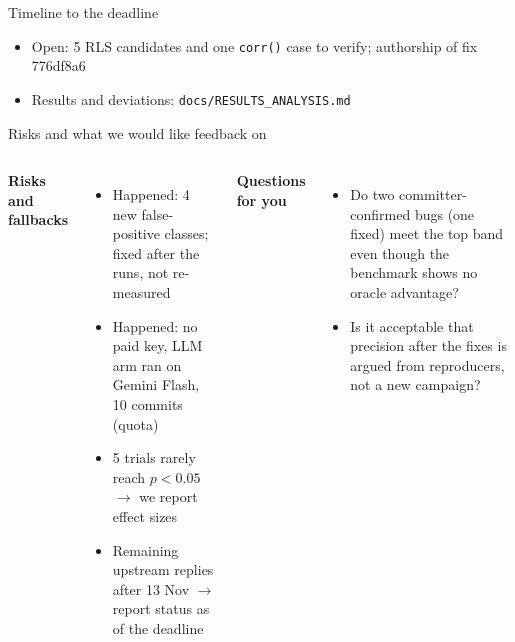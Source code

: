 \documentclass[aspectratio=169,11pt]{beamer}
\begin{document}
\begin{frame}{Timeline to the deadline}
\begin{center}
\end{center}
\small
\begin{itemize}
  \item Open: 5 RLS candidates and one \texttt{corr()} case to verify; authorship of fix 776df8a6
  \item Results and deviations: \texttt{docs/RESULTS\_ANALYSIS.md}
\end{itemize}
\end{frame}

\begin{frame}{Risks and what we would like feedback on}
\begin{columns}[T]
\textbf{Risks and fallbacks}
\small
\begin{itemize}
  \item Happened: 4 new false-positive classes; fixed after the runs, not re-measured
  \item Happened: no paid key, LLM arm ran on Gemini Flash, 10 commits (quota)
  \item 5 trials rarely reach $p<0.05$ $\rightarrow$ we report effect sizes
  \item Remaining upstream replies after 13 Nov $\rightarrow$ report status as of the deadline
\end{itemize}
\textbf{Questions for you}
\small
\begin{itemize}
  \item Do two committer-confirmed bugs (one fixed) meet the top band even though the benchmark shows no oracle advantage?
  \item Is it acceptable that precision after the fixes is argued from reproducers, not a new campaign?
\end{itemize}
\end{columns}
\end{frame}
\end{document}
